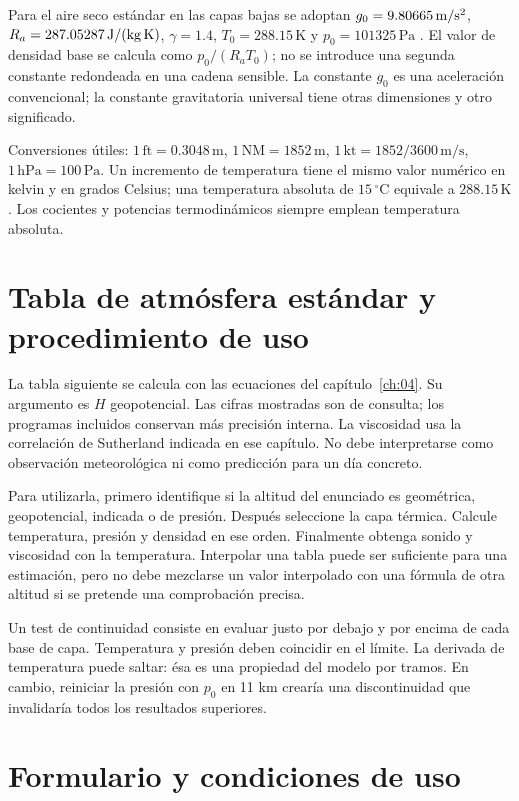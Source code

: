 Para el aire seco estándar en las capas bajas se adoptan $g_0=9.80665\,\mathrm{m/s^2}$, $R_a=287.05287\,\mathrm{J/(kg\,K)}$, $\gamma=1.4$, $T_0=288.15\,\mathrm K$ y $p_0=101325\,\mathrm{Pa}$ \cite{ISA1976}. El valor de densidad base se calcula como $p_0/(R_aT_0)$; no se introduce una segunda constante redondeada en una cadena sensible. La constante $g_0$ es una aceleración convencional; la constante gravitatoria universal tiene otras dimensiones y otro significado.

Conversiones útiles: $1\,\mathrm{ft}=0.3048\,\mathrm m$, $1\,\mathrm{NM}=1852\,\mathrm m$, $1\,\mathrm{kt}=1852/3600\,\mathrm{m/s}$, $1\,\mathrm{hPa}=100\,\mathrm{Pa}$. Un incremento de temperatura tiene el mismo valor numérico en kelvin y en grados Celsius; una temperatura absoluta de $15\,{}^\circ\mathrm C$ equivale a $288.15\,\mathrm K$. Los cocientes y potencias termodinámicos siempre emplean temperatura absoluta.

\chapter{Tabla de atmósfera estándar y procedimiento de uso}\label{ap:tablaISA}
La tabla siguiente se calcula con las ecuaciones del capítulo~\ref{ch:04}. Su argumento es $H$ geopotencial. Las cifras mostradas son de consulta; los programas incluidos conservan más precisión interna. La viscosidad usa la correlación de Sutherland indicada en ese capítulo. No debe interpretarse como observación meteorológica ni como predicción para un día concreto.


Para utilizarla, primero identifique si la altitud del enunciado es geométrica, geopotencial, indicada o de presión. Después seleccione la capa térmica. Calcule temperatura, presión y densidad en ese orden. Finalmente obtenga sonido y viscosidad con la temperatura. Interpolar una tabla puede ser suficiente para una estimación, pero no debe mezclarse un valor interpolado con una fórmula de otra altitud si se pretende una comprobación precisa.

Un test de continuidad consiste en evaluar justo por debajo y por encima de cada base de capa. Temperatura y presión deben coincidir en el límite. La derivada de temperatura puede saltar: ésa es una propiedad del modelo por tramos. En cambio, reiniciar la presión con $p_0$ en 11 km crearía una discontinuidad que invalidaría todos los resultados superiores.

\chapter{Formulario y condiciones de uso}\label{ap:formulario}
